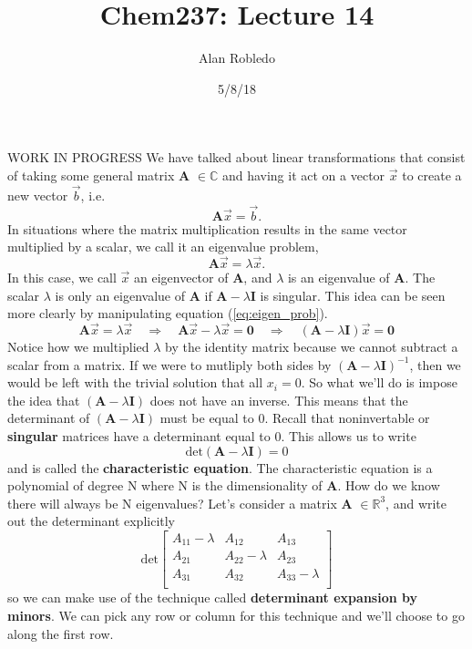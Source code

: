 \documentclass{article}
\title{Chem237: Lecture 14}
\date{5/8/18}
\author{Alan Robledo}
\newcommand{\be}{\begin{equation}}
\newcommand{\ee}{\end{equation}}
\begin{document}
\maketitle
WORK IN PROGRESS
We have talked about linear transformations that consist of taking some general matrix \textbf{A} $\in \mathbb{C}$ and having it act on a vector $\vec{x}$ to create a new vector $\vec{b}$, i.e.
\be
  \textbf{A} \vec{x} = \vec{b} .
\ee
In situations where the matrix multiplication results in the same vector multiplied by a scalar, we call it an eigenvalue problem,
\be \label{eq:eigen_prob}
  \textbf{A} \vec{x} = \lambda \vec{x} .
\ee
In this case, we call $\vec{x}$ an eigenvector of \textbf{A}, and $\lambda$ is an eigenvalue of \textbf{A}.
The scalar $\lambda$ is only an eigenvalue of \textbf{A} if $\textbf{A} - \lambda \textbf{I}$ is singular.
This idea can be seen more clearly by manipulating equation (\ref{eq:eigen_prob}).
\be
  \textbf{A} \vec{x} = \lambda \vec{x} \quad \Longrightarrow \quad \textbf{A} \vec{x} - \lambda \vec{x} = \textbf{0} \quad \Longrightarrow \quad (\textbf{A} - \lambda \textbf{I})\vec{x} = \textbf{0}
\ee
Notice how we multiplied $\lambda$ by the identity matrix because we cannot subtract a scalar from a matrix.
If we were to mutliply both sides by $(\textbf{A} - \lambda \textbf{I})^{-1}$, then we would be left with the trivial solution that all $x_i = 0$.
So what we'll do is impose the idea that $(\textbf{A} - \lambda \textbf{I})$ does not have an inverse.
This means that the determinant of $(\textbf{A} - \lambda \textbf{I})$ must be equal to 0.
Recall that noninvertable or \textbf{singular} matrices have a determinant equal to 0.
This allows us to write
\be
  \text{det}(\textbf{A} - \lambda \textbf{I}) = 0
\ee
and is called the \textbf{characteristic equation}.
The characteristic equation is a polynomial of degree N where N is the dimensionality of \textbf{A}.
How do we know there will always be N eigenvalues?
Let's consider a matrix \textbf{A} $\in \mathbb{R}^3$, and write out the determinant explicitly
\be
  \text{det}
  \begin{bmatrix}
    A_{11} - \lambda  & A_{12} & A_{13} \\
    A_{21} & A_{22} - \lambda & A_{23} \\
    A_{31} & A_{32} & A_{33} - \lambda \\
  \end{bmatrix}
\ee
so we can make use of the technique called \textbf{determinant expansion by minors}.
We can pick any row or column for this technique and we'll choose to go along the first row.
\end{document}
